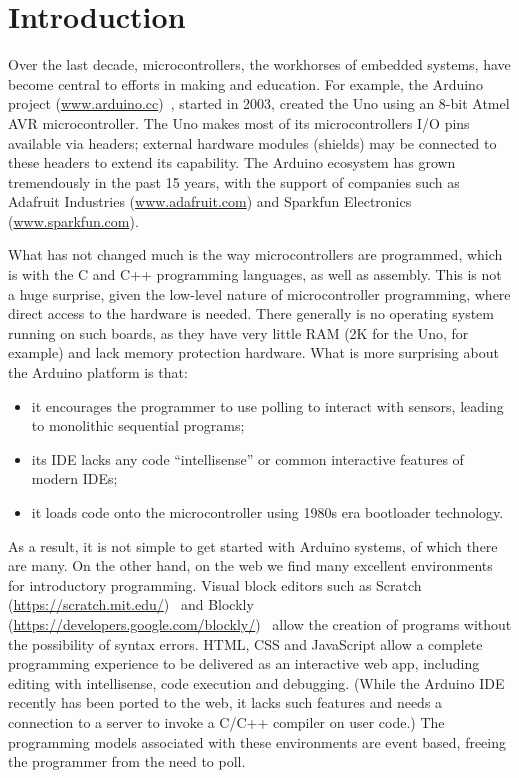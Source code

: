 \section{Introduction}
\label{sec:intro}

Over the last decade, microcontrollers, the workhorses of embedded systems, have become 
central to efforts in making and education. For example, the Arduino project 
(\url{www.arduino.cc})~\cite{buildingArduino2014}, 
started in 2003, created the Uno using an 8-bit Atmel 
AVR microcontroller. The Uno makes most of its microcontrollers I/O pins available via headers;
external hardware modules (shields) may be connected to these headers to extend 
its capability.    The Arduino ecosystem has grown tremendously in the past 15 years, 
with the support of companies such as Adafruit Industries (\url{www.adafruit.com}) and 
Sparkfun Electronics (\url{www.sparkfun.com}).

What has not changed much is the way microcontrollers are programmed,
which is with the C and C++ programming languages, as well as assembly.   
This is not a huge surprise, given the low-level nature of microcontroller programming, 
where direct access to the hardware is needed. There generally is no operating 
system running on such boards, as they have very little RAM (2K for the Uno, for example) and 
lack memory protection hardware. What is more surprising about the Arduino platform is that:
\begin{itemize}
\item it encourages the programmer to use polling to interact with sensors, 
leading to monolithic sequential programs;
\item its IDE lacks any code ``intellisense'' or common interactive features of modern IDEs;
\item it loads code onto the microcontroller using 1980s era bootloader technology.
\end{itemize}
As a result, it is not simple to get started with Arduino systems, of which there are many. 
On the other hand, on the web we find many excellent environments for introductory programming. 
Visual block editors such as Scratch (\url{https://scratch.mit.edu/})~\cite{ScratchCACM2009,BlocksBeyondCACM2017} 
and Blockly (\url{https://developers.google.com/blockly/})~\cite{Blocky2015}
allow the creation of programs without the possibility of syntax errors. 
HTML, CSS and JavaScript allow a complete programming experience to be delivered as an interactive 
web app, including editing with intellisense, code execution and debugging. (While the Arduino IDE recently 
has been ported to the web, it lacks such features and needs a connection to a server to invoke 
a C/C++ compiler on user code.) The programming models associated with these environments are 
event based, freeing the programmer from the need to poll.

